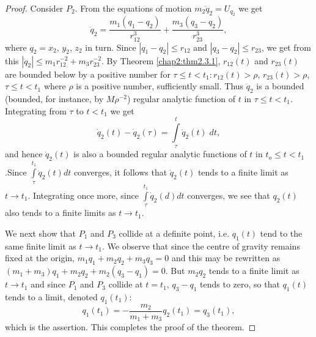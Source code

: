\begin{proof}
Consider $P_2$. From the equations of motion $m_2 \ddot{q}_2 = U_{q_2}$ we get
$$
 \ddot{q}_2 = \frac{m_1(q_1-q_2)}{r^3_{12}} + \frac{m_3(q_3 - q_2)}{r^3_{23}},
$$
where $q_2 = x_2$, $y_2$, $z_2$ in turn. Since $|q_1 - q_2| \leq r_{12}$ and $|q_3 - q_2| \leq r_{23}$, we get from this $|\ddot{q}_2| \leq m_1 r^{-2}_{12} + m_3 r^{-2}_{23}$. By Theorem \ref{chap2:thm2.3.1}, $r_{12}(t)$ and $r_{23} (t)$ are bounded below by a positive number for $\tau \leq t < t_1 : r_{12} (t) > \rho$, $r_{23} (t) > \rho$, $\tau \leq t < t_1$ where $\rho$ is a positive number, sufficiently small. Thus $\ddot{q}_2$ is a bounded (bounded, for instance, by $M \rho^{-2}$) regular analytic function of $t$ in $\tau \leq t < t_1$. Integrating from $\tau$ to $t<t_1$ we get
\begin{equation*}
\dot{q}_2(t) - \dot{q}_2 (\tau) = \int\limits^t_\tau \ddot{q}_2 (t) \; dt, \tag{2.3.1}\label{chap2:eq2.3.1} 
\end{equation*}
and hence $\dot{q}_2(t)$ is also a bounded regular analytic functions of $t$ in $t_o \leq t < t_1$.\pageoriginale Since $\int\limits^{t_1}_{\tau} \ddot{q}_2(t)dt$ converges, it follows that $\dot{q}_2(t)$ tends to a finite limit as $t \to t_1$. Integrating once more, since $\int\limits^{t_1}_\tau \dot{q}_2(d)dt$ converges, we see that $q_2(t)$ also tends to a finite limits as $t \to t_1$.

We next show that $P_1$ and $P_3$ collide at a definite point, i.e. $q_1(t)$ tend to the same finite limit as $t \to t_1$. We observe that since the centre of gravity remains fixed at the origin, $m_1q_1 + m_2 q_2 + m_3 q_3 = 0$ and this may be rewritten as $(m_1 + m_3) q_1+ m_2 q_2 + m_2 (q_3 - q_1) = 0$. But $m_2 q_2$ tends to a finite limit as $t \to t_1$ and since $P_1$ and $P_3$ collide at $t = t_1$, $q_3 - q_1$ tends to zero, so that $q_1(t)$ tends to a limit, denoted $q_1(t_1)$:
$$
q_1(t_1) = - \frac{m_2}{m_1+m_3} q_2(t_1) = q_3 (t_1), 
$$
which is the assertion. This completes the proof of the theorem.
\end{proof}


